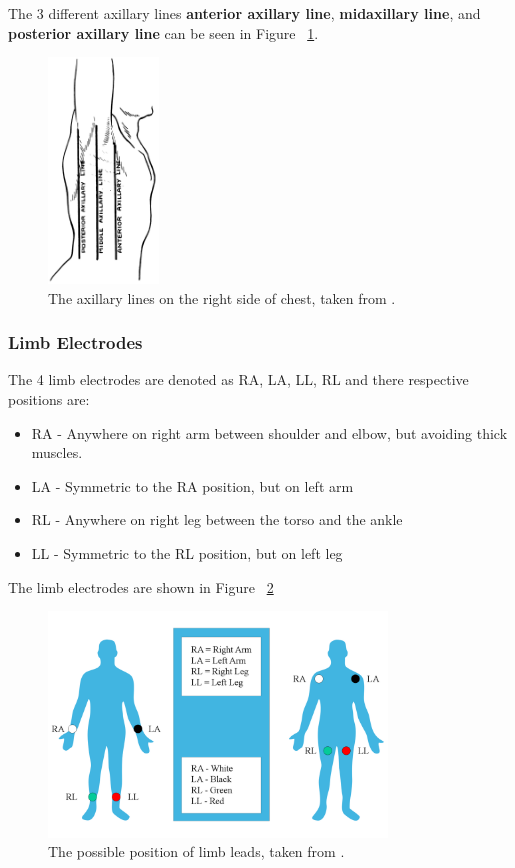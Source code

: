 The 3 different axillary lines \textbf{anterior axillary line}, \textbf{midaxillary line}, and \textbf{posterior axillary line} can be seen in Figure ~\ref{fig:axillary_lines}. 

\begin{figure}[htpb]
	\centering
	\includegraphics[width=\textwidth,height=6cm,keepaspectratio=true]{images/Brantigan_1963_1-53.png}
	\caption{
		The axillary lines on the right side of chest, taken from \cite{wiki:aux_lines}.
	}
	\label{fig:axillary_lines}
\end{figure}



\subsubsection{Limb Electrodes}
The 4 limb electrodes are denoted as RA, LA, LL, RL and there respective positions are:

\begin{itemize}
	\item RA - Anywhere on right arm between shoulder and elbow, but avoiding thick muscles.
	\item LA - Symmetric to the RA position, but on left arm
	\item RL - Anywhere on right leg between the torso and the ankle
	\item LL - Symmetric to the RL position, but on left leg
\end{itemize} 

The limb electrodes are shown in Figure ~\ref{fig:limb_leads}

\begin{figure}[htpb]
	\centering
	\includegraphics[width=\textwidth,height=6cm,keepaspectratio=true]{images/Limb_leads}
	\caption{
		The possible position of limb leads, taken from \cite{wiki:limb_leads}.
	}
	\label{fig:limb_leads}
\end{figure}


